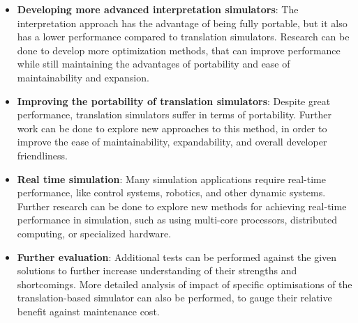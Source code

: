 \begin{itemize}
    \item{\textbf{Developing more advanced interpretation simulators}: The interpretation approach has the advantage of
     being fully portable, but it also has a lower performance compared to translation simulators. Research can be done
     to develop more optimization methods, that can improve performance while still maintaining the advantages of
     portability and ease of maintainability and expansion.}
     \item{\textbf{Improving the portability of translation simulators}: Despite great performance, translation
     simulators suffer in terms of portability. Further work can be done to explore new approaches to this method, in
     order to improve the ease of maintainability, expandability, and overall developer friendliness.}
     \item{\textbf{Real time simulation}: Many simulation applications require real-time performance, like control
     systems, robotics, and other dynamic systems. Further research can be done to explore new methods for achieving
     real-time performance in simulation, such as using multi-core processors, distributed computing, or specialized
     hardware.}
     \item{\textbf{Further evaluation}: Additional tests can be performed against the given solutions to further increase understanding of their strengths and shortcomings.
     More detailed analysis of impact of specific optimisations of the translation-based simulator can also be performed, to gauge their relative benefit against maintenance cost.}
\end{itemize}
